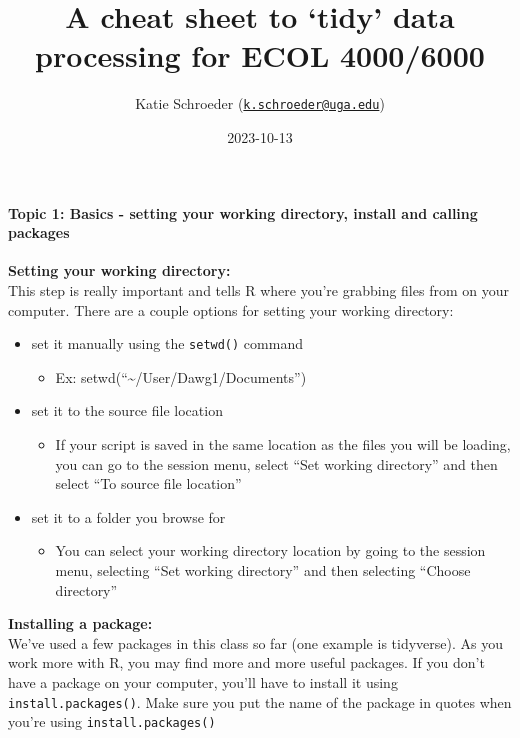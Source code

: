 \documentclass[
]{article}
\title{A cheat sheet to `tidy' data processing for ECOL 4000/6000}
\author{Katie Schroeder
(\href{mailto:k.schroeder@uga.edu}{\nolinkurl{k.schroeder@uga.edu}})}
\date{2023-10-13}
\providecommand{\tightlist}{%
  \setlength{\itemsep}{0pt}\setlength{\parskip}{0pt}}
\begin{document}
\maketitle

\hypertarget{topic-1-basics---setting-your-working-directory-install-and-calling-packages}{%
\paragraph{Topic 1: Basics - setting your working directory, install and
calling
packages}\label{topic-1-basics---setting-your-working-directory-install-and-calling-packages}}

\textbf{Setting your working directory:}\\
This step is really important and tells R where you're grabbing files
from on your computer. There are a couple options for setting your
working directory:

\begin{itemize}
\tightlist
\item
  set it manually using the \texttt{setwd()} command

  \begin{itemize}
  \tightlist
  \item
    Ex: setwd(``\textasciitilde/User/Dawg1/Documents'')\\
  \end{itemize}
\item
  set it to the source file location

  \begin{itemize}
  \tightlist
  \item
    If your script is saved in the same location as the files you will
    be loading, you can go to the session menu, select ``Set working
    directory'' and then select ``To source file location''
  \end{itemize}
\item
  set it to a folder you browse for

  \begin{itemize}
  \tightlist
  \item
    You can select your working directory location by going to the
    session menu, selecting ``Set working directory'' and then selecting
    ``Choose directory''
  \end{itemize}
\end{itemize}

\textbf{Installing a package:}\\
We've used a few packages in this class so far (one example is
tidyverse). As you work more with R, you may find more and more useful
packages. If you don't have a package on your computer, you'll have to
install it using \texttt{install.packages()}. Make sure you put the name
of the package in quotes when you're using \texttt{install.packages()}
\end{document}
